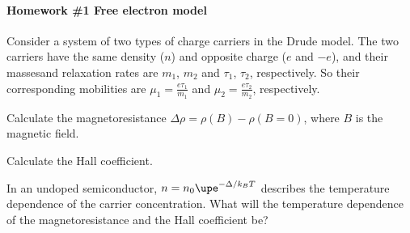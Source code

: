 
\paragraph{Homework \#1 Free electron model}

\begin{problem}
  Consider a system of two types of charge carriers in the Drude model.
  The two carriers have the same density ($n$)
  and opposite charge ($e$ and $-e$),
  and their massesand relaxation rates are $m_1$, $m_2$ and $\tau_1$, $\tau_2$,
  respectively.
  So their corresponding mobilities are $\mu_1 = \frac{e\tau_1}{m_1}$ and
  $\mu_2 = \frac{e\tau_2}{m_2}$, respectively.
  \begin{enumext}[label = (\alph*)]
    \item Calculate the magnetoresistance $\Delta \rho = \rho(B) - \rho(B = 0)$,
    where $B$ is the magnetic field.
    \item Calculate the Hall coefficient.
    \item In an undoped semiconductor, $n = n_0 \upe^{-\Delta/k_BT}$
    describes the temperature dependence of the carrier concentration.
    What will the temperature dependence of the magnetoresistance
    and the Hall coefficient be?
  \end{enumext}
\end{problem}
